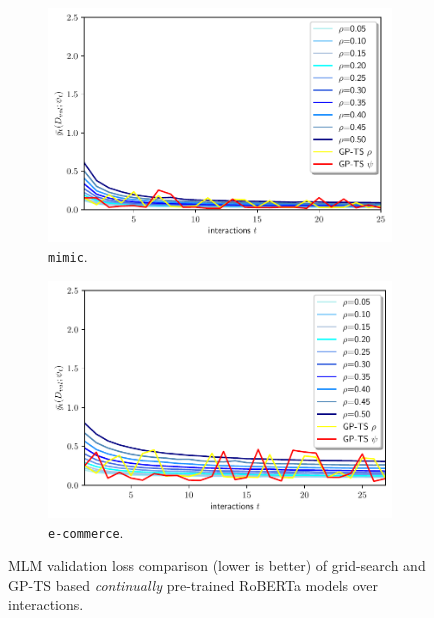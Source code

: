 \begin{figure}[!h]
	\centering
	\begin{subfigure}[c]{0.32\textwidth}
		\includegraphics[width=\textwidth]{./figs/medical_robertabase_pre_training_loss}
		\vspace*{-4ex}
		\caption{\texttt{mimic}.}
		\label{fig:continual_pretraining_mimic}
	\end{subfigure}
	\begin{subfigure}[c]{0.32\textwidth}
		\includegraphics[width=\textwidth]{./figs/ebay_robertabase_pre_training_loss}
		\vspace*{-4ex}
		\caption{\texttt{e-commerce}.}
		\label{fig:continual_pretraining_ebay}
	\end{subfigure}
	\vspace*{-1ex}
	\caption{MLM validation loss comparison (lower is better) of grid-search and GP-TS based \textit{continually} pre-trained RoBERTa models over interactions.
	}
	\label{fig:continual_pretraining}
\end{figure}

